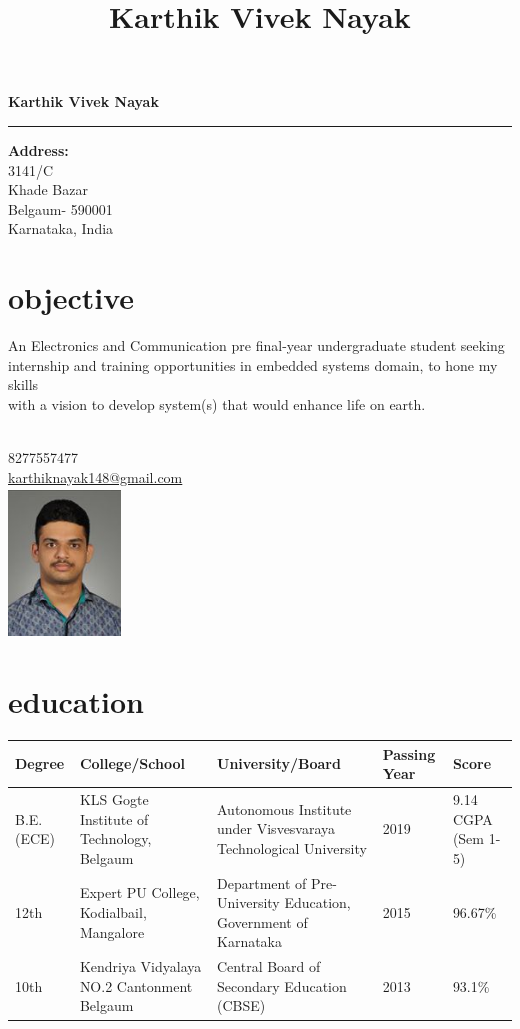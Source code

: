 \documentclass[10pt]{article}
\renewcommand{\maketitle}{
\begin{center}
\huge\bfseries
Karthik Vivek Nayak

\hrule

\end{center}
\vspace{0.1cm}
}
\begin{document}
\title{Karthik Vivek Nayak}
\maketitle
\begin{minipage}{0.8\linewidth}
\textbf{Address:\\}
3141/C\\
Khade Bazar\\
Belgaum- 590001 \\
Karnataka, India\\ 
\section*{objective}
An Electronics and Communication pre final-year undergraduate student seeking \\ internship and training opportunities in embedded systems domain, to hone my skills\\ with a vision to develop system(s) that would enhance life on earth.
\vspace{1cm}
\end{minipage}
\begin{minipage}{0.1\linewidth}
\begin{flushright}
\\
8277557477\\
\href{mailto:karthiknayak148@gmail.com}{karthiknayak148@gmail.com}\\
\vspace{1cm}
\includegraphics[width=3cm,height=4cm]{kartik.jpg}
\end{flushright}
\end{minipage}

\section*{education}
\begin{tabular}{|l|p{40mm}|p{50mm}|l|p{20mm}|}
\hline
Degree & College/School & University/Board & Passing Year & Score\\
\hline
B.E.(ECE)&KLS Gogte Institute of Technology, Belgaum&Autonomous Institute under Visvesvaraya Technological University&2019&9.14 CGPA (Sem 1-5)\\
\hline
12th &Expert PU College, Kodialbail, Mangalore&Department of Pre-University Education, Government of Karnataka&2015&96.67\%\\
\hline
10th &Kendriya Vidyalaya NO.2 Cantonment Belgaum&Central Board of Secondary Education (CBSE)&2013&93.1\%\\
\hline
\end{tabular}
\end{document}
